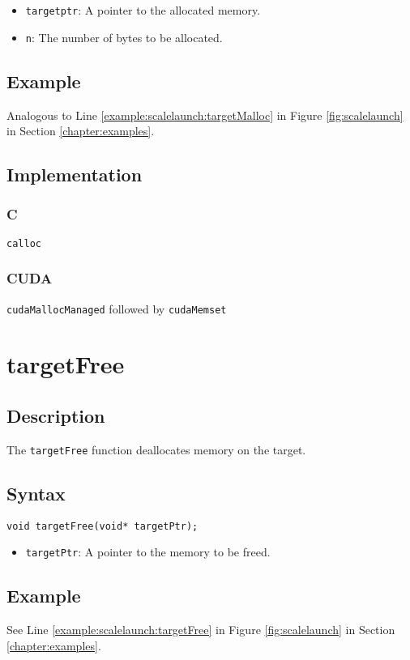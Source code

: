 \begin{itemize}
\item \verb+targetptr+: A pointer to the allocated memory.
\item \verb+n+: The number of bytes to be allocated.
\end{itemize}


\subsection{Example}
Analogous to Line \ref{example:scalelaunch:targetMalloc} in Figure \ref{fig:scalelaunch} in Section \ref{chapter:examples}.

\subsection{Implementation}
\subsubsection{C}
\verb+calloc+
\subsubsection{CUDA}
\verb+cudaMallocManaged+ followed by \verb+cudaMemset+


\newpage
\section{targetFree}

\subsection{Description}

The \verb+targetFree+ function deallocates memory on the target.

\subsection{Syntax}
\begin{verbatim}
void targetFree(void* targetPtr);
\end{verbatim}

\begin{itemize}
\item \verb+targetPtr+: A pointer to the memory to be freed.
\end{itemize}


\subsection{Example}
See Line \ref{example:scalelaunch:targetFree} in Figure \ref{fig:scalelaunch} in Section \ref{chapter:examples}.

